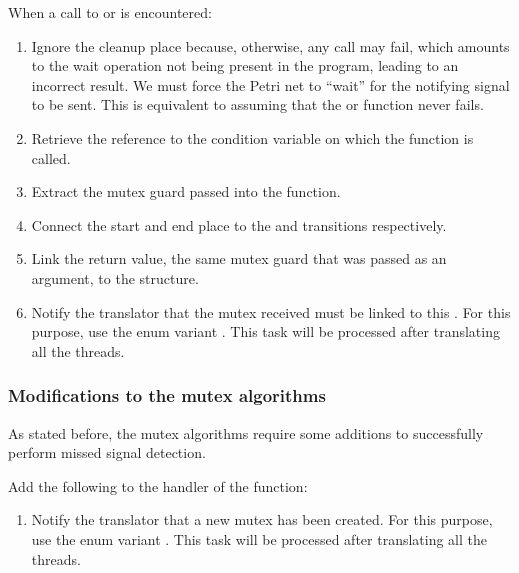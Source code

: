 When a call to 
or  is encountered:

\begin{enumerate}
  \item Ignore the cleanup place because, otherwise, any call may fail,
        which amounts to the wait operation not being present in the program,
        leading to an incorrect result.
        We must force the Petri net
        to ``wait'' for the notifying signal to be sent.
        This is equivalent to assuming that the 
        or  function never fails.
  \item Retrieve the  reference to the condition variable
        on which the function is called.
  \item Extract the mutex guard passed into the function.
  \item Connect the start and end place to the
         and  transitions respectively.
  \item Link the return value, the same mutex guard that was passed as an argument,
        to the  structure.
  \item Notify the translator that the mutex received must be linked to this .
        For this purpose, use the enum variant .
        This task will be processed after translating all the threads.
\end{enumerate}

\subsubsection{Modifications to the mutex algorithms}

As stated before, the mutex algorithms require some additions to successfully
perform missed signal detection.

Add the following to the handler of the  function:

\begin{enumerate}
  \item Notify the translator that a new mutex has been created.
        For this purpose, use the enum variant .
        This task will be processed after translating all the threads.
\end{enumerate}

